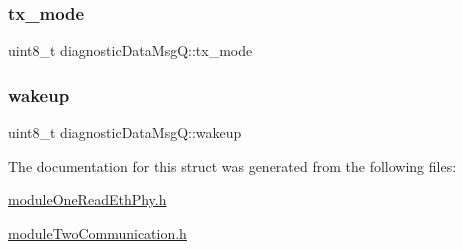 \mbox{\label{structdiagnostic_data_msg_q_abc446ab4a822dc4fba0cbb6d3f5b234c}} 
\subsubsection{\texorpdfstring{tx\+\_\+mode}{tx\_mode}}
{\footnotesize\ttfamily uint8\+\_\+t diagnostic\+Data\+Msg\+Q\+::tx\+\_\+mode}

\mbox{\label{structdiagnostic_data_msg_q_a1dc3ed269a7173a68e81cf00a13ed0d3}} 
\subsubsection{\texorpdfstring{wakeup}{wakeup}}
{\footnotesize\ttfamily uint8\+\_\+t diagnostic\+Data\+Msg\+Q\+::wakeup}



The documentation for this struct was generated from the following files\+:\begin{DoxyCompactItemize}
\item 
\mbox{\hyperlink{module_one_read_eth_phy_8h}{module\+One\+Read\+Eth\+Phy.\+h}}\item 
\mbox{\hyperlink{module_two_communication_8h}{module\+Two\+Communication.\+h}}\end{DoxyCompactItemize}
